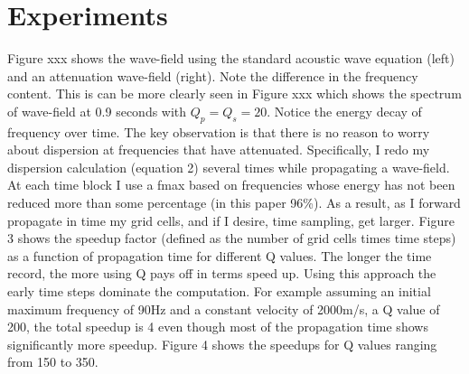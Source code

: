 \documentclass{paris17}
\begin{document}
\section{Experiments}

Figure xxx shows the wave-field using the standard acoustic wave equation (left) and an attenuation wave-field (right). Note the difference in the frequency content. This is can be more clearly seen in Figure xxx which shows the spectrum of wave-field at 0.9 seconds with $Q_p = Q_s = 20$. Notice the energy decay of frequency over time. The key observation is that there is no reason to worry about dispersion at frequencies that have attenuated. Specifically, I redo my dispersion calculation (equation 2) several times while propagating a wave-field. At each time block I use a fmax based on frequencies whose energy has not been reduced more than some percentage (in this paper 96\%). As a result, as I forward propagate in time my grid cells, and if I desire, time sampling, get larger. Figure 3 shows the speedup factor (defined as the number of grid cells times time steps) as a function of propagation time for different Q values. The longer the time record, the more using Q pays off in terms speed up. Using this approach the early time steps dominate the computation. For example assuming an initial maximum frequency of 90Hz and a constant velocity of 2000m/s, a Q value of 200, the total speedup is 4 even though most of the propagation time shows significantly more speedup. Figure 4 shows the speedups for Q values ranging from 150 to 350.
\end{document}
